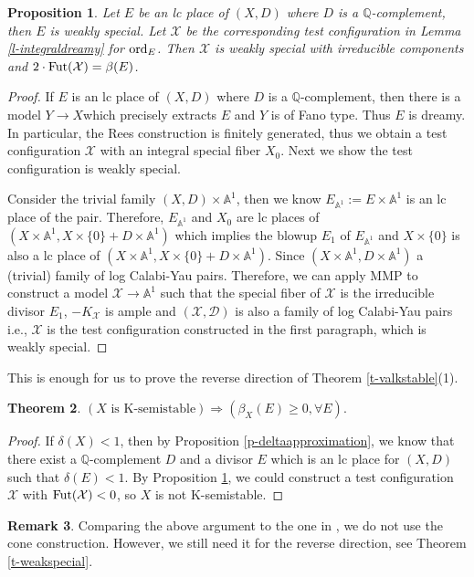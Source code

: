 \documentclass[12pt,reqno]{amsart}%
\newcommand{\cX}{{\mathcal{X}}}
\newcommand{\ord}{{\rm ord}}
\newtheorem{thm}{Theorem}[section]
\newtheorem{prop}[thm]{Proposition}
\theoremstyle{definition}
\newtheorem{rem}[thm]{Remark}
\theoremstyle{remark}
\newcommand{\Fut}{{\rm Fut}}
\newcommand{\cD}{{\mathcal{D}}}
\newcommand{\bQ}{{\mathbb{Q}}}
\begin{document}
\begin{prop}\label{p-lctotest}
Let $E$ be an lc place of $(X,D)$ where $D$ is a $\bQ$-complement, then $E$ is weakly special. Let $\cX$ be the corresponding test configuration in Lemma \ref{l-integraldreamy} for $\ord_E$. Then $\cX$ is weakly special with irreducible components and $2\cdot \Fut(\cX)=\beta(E)$. 
\end{prop}
\begin{proof}
If $E$ is an lc place of $(X,D)$ where $D$ is a $\bQ$-complement, then there is a model $Y\to X $which precisely extracts $E$ and $Y$ is of Fano type. Thus $E$ is dreamy. In particular, the Rees construction is finitely generated, thus we obtain a test configuration $\cX$ with an integral special fiber $X_0$. Next we show the test configuration is weakly special.

Consider the trivial family $(X,D)\times \mathbb{A}^1$, then we know $E_{\mathbb{A}^1}:=E\times \mathbb{A}^1$ is an lc place of the pair. Therefore, $E_{\mathbb{A}^1}$ and $X_0$ are lc places of $(X\times \mathbb{A}^1,X\times\{0\}+D\times \mathbb{A}^1)$ which implies the blowup  $E_1$ of $E_{\mathbb{A}^1}$ and $X\times\{0\}$ is also a lc place of $(X\times \mathbb{A}^1,X\times\{0\}+D\times \mathbb{A}^1)$. Since $(X\times \mathbb{A}^1,D\times \mathbb{A}^1)$ a (trivial) family of  log Calabi-Yau pairs. Therefore, we can apply MMP to construct a model $\cX\to \mathbb{A}^1$ such that the special fiber of $\cX$ is the irreducible divisor $E_1$, $-K_{\cX}$ is ample and $(\cX, \cD)$ is also a family of log Calabi-Yau pairs i.e., $\cX$ is the test configuration constructed in the first paragraph, which is weakly special. 
\end{proof} 



This is enough for us to prove the reverse direction of Theorem \ref{t-valkstable}(1).
\begin{thm}\label{t-kimpliesbeta}
$(\mbox{$X$ is K-semistable})\Longrightarrow(\beta_X(E)\ge 0, \forall E).$
\end{thm}
\begin{proof} 
If $\delta(X)<1$, then by Proposition \ref{p-deltaapproximation}, we know that there exist a $\bQ$-complement $D$ and a divisor $E$ which is an lc place for $(X,D)$ such that $\delta(E)<1$.
By Proposition \ref{p-lctotest}, we could construct a test configuration $\cX$ with $\Fut(\cX)<0$, so $X$ is not K-semistable. 
\end{proof}
\begin{rem}Comparing the above argument to the one in \cite{LX20}, we do not use the cone construction. However, we still need it for the reverse direction, see Theorem \ref{t-weakspecial}.  
\end{rem}
\end{document}
